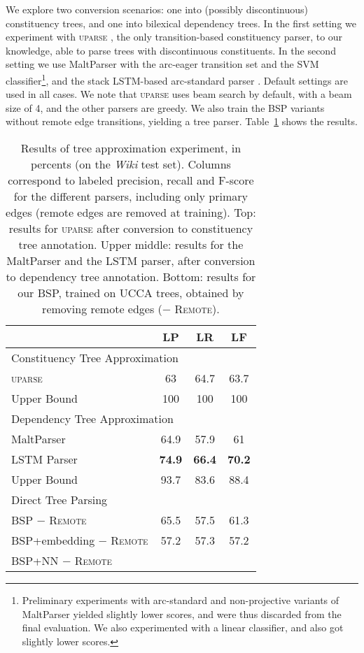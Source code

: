 \documentclass[11pt]{article}
\newcommand{\tabref}[1]{Table~\ref{#1}}
\begin{document}
We explore two conversion scenarios: one into (possibly discontinuous) constituency trees,
and one into bilexical dependency trees. In the first setting we experiment with \textsc{uparse}
\cite{maier2015discontinuous},
the only transition-based constituency parser, to our knowledge, able to parse trees with
discontinuous constituents.
In the second setting we use MaltParser \cite{nivre2007maltparser} with the
arc-eager transition set and the SVM classifier\footnote{Preliminary
experiments with arc-standard and non-projective variants of MaltParser yielded slightly
lower scores, and were thus discarded from the final evaluation.
We also experimented with a linear classifier, and also got slightly lower scores.},
and the stack LSTM-based arc-standard parser \cite{dyer2015transition}.
Default settings are used in all cases.
We note that \textsc{uparse} uses beam search by default,
with a beam size of 4, and the other parsers are greedy.
We also train the BSP variants without remote edge transitions, yielding a tree parser.
\tabref{fig:tree_approx_results} shows the results.

\begin{table}[ht]
\centering
\begin{tabular}{l|ccc}
& \textbf{LP} & \textbf{LR} & \textbf{LF} \\
\hline
\multicolumn{4}{l}{\rule{0pt}{2ex} \footnotesize Constituency Tree Approximation} \\
\textsc{uparse} & 63 & 64.7 & 63.7 \\
Upper Bound & 100 & 100 & 100 \\
\hline
\multicolumn{4}{l}{\rule{0pt}{2ex} \footnotesize Dependency Tree Approximation} \\
MaltParser & 64.9 & 57.9 & 61 \\
LSTM Parser & {\bf 74.9} & {\bf 66.4} & {\bf 70.2} \\
Upper Bound & 93.7 & 83.6 & 88.4 \\
\hline
\multicolumn{4}{l}{\rule{0pt}{2ex} \footnotesize Direct Tree Parsing} \\
BSP $-$ \textsc{Remote} & 65.5 & 57.5 & 61.3 \\
BSP+embedding $-$ \textsc{Remote} & 57.2 & 57.3 & 57.2 \\
BSP+NN $-$ \textsc{Remote} &  \\
\end{tabular}
\caption{\label{fig:tree_approx_results}
  Results of tree approximation experiment, in percents (on the \textit{Wiki} test set).
  Columns correspond to labeled precision,
  recall and F-score for the different parsers, including only primary edges
  (remote edges are removed at training).
  Top: results for \textsc{uparse}
  after conversion to constituency tree annotation. Upper middle: results for the
  MaltParser and the LSTM parser, after conversion to dependency tree annotation.
  Bottom: results for our BSP, trained on
  UCCA trees, obtained by removing remote edges ($-$ \textsc{Remote}).
}
\end{table}
\end{document}
